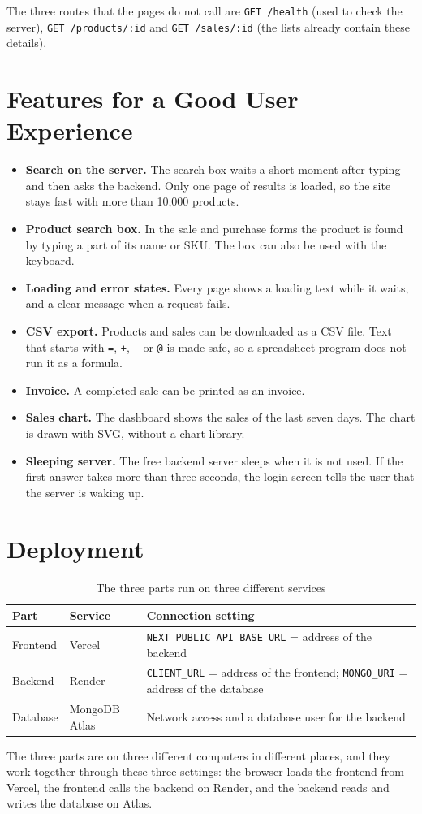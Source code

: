 \documentclass[11pt,a4paper]{article}
\newcommand{\code}[1]{\texttt{#1}}
\begin{document}
The three routes that the pages do not call are \code{GET /health} (used to check the server), \code{GET /products/:id} and \code{GET /sales/:id} (the lists already contain these details).

\section{Features for a Good User Experience}
\begin{itemize}
  \item \textbf{Search on the server.} The search box waits a short moment after typing and then asks the backend. Only one page of results is loaded, so the site stays fast with more than 10,000 products.
  \item \textbf{Product search box.} In the sale and purchase forms the product is found by typing a part of its name or SKU. The box can also be used with the keyboard.
  \item \textbf{Loading and error states.} Every page shows a loading text while it waits, and a clear message when a request fails.
  \item \textbf{CSV export.} Products and sales can be downloaded as a CSV file. Text that starts with \code{=}, \code{+}, \code{-} or \code{@} is made safe, so a spreadsheet program does not run it as a formula.
  \item \textbf{Invoice.} A completed sale can be printed as an invoice.
  \item \textbf{Sales chart.} The dashboard shows the sales of the last seven days. The chart is drawn with SVG, without a chart library.
  \item \textbf{Sleeping server.} The free backend server sleeps when it is not used. If the first answer takes more than three seconds, the login screen tells the user that the server is waking up.
\end{itemize}

\section{Deployment}
\begin{table}[h]
\centering
\begin{tabularx}{\textwidth}{@{}P{2.4cm}P{2.6cm}Y@{}}
\toprule
\textbf{Part} & \textbf{Service} & \textbf{Connection setting} \\
\midrule
Frontend & Vercel & \code{NEXT\_PUBLIC\_API\_BASE\_URL} = address of the backend \\
Backend & Render & \code{CLIENT\_URL} = address of the frontend; \code{MONGO\_URI} = address of the database \\
Database & MongoDB Atlas & Network access and a database user for the backend \\
\bottomrule
\end{tabularx}
\caption{The three parts run on three different services}
\end{table}
The three parts are on three different computers in different places, and they work together through these three settings: the browser loads the frontend from Vercel, the frontend calls the backend on Render, and the backend reads and writes the database on Atlas.
\end{document}
